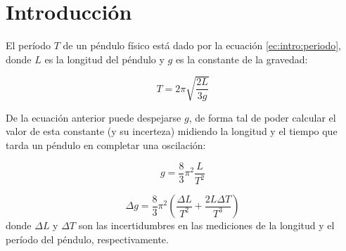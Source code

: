 \section{Introducción}

El período $T$ de un péndulo físico está dado por la ecuación
\ref{ec:intro:periodo}, donde $L$ es la longitud del péndulo y $g$ es la
constante de la gravedad:

\begin{equation}
    \label{ec:intro:periodo}
    T = 2\pi \sqrt{\frac{2L}{3g}}
\end{equation}

De la ecuación anterior puede despejarse $g$, de forma tal de poder calcular el
valor de esta constante (y su incerteza) midiendo la longitud y el tiempo que
tarda un péndulo en completar una oscilación:

\begin{equation}
    \label{ec:intro:gravedad}
    g = \frac{8}{3} \pi^2 \frac{L}{T^2}
\end{equation}

\begin{equation}
    \label{ec:intro:error-gravedad}
    \Delta g = \frac{8}{3} \pi^2 \left( \frac{\Delta L}{T^2} +
                                        \frac{2L \Delta T}{T^3}
                                    \right)
\end{equation}
donde $\Delta L$ y $\Delta T$ son las incertidumbres en las mediciones de la
longitud y el período del péndulo, respectivamente. 
